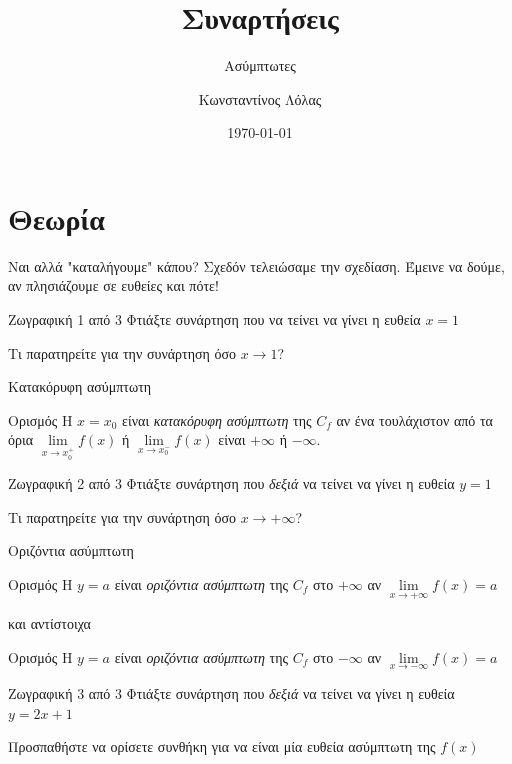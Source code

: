 \documentclass{presentation}
\title{Συναρτήσεις}
\subtitle{Ασύμπτωτες}
\author[Λόλας]{Κωνσταντίνος Λόλας}
\date{\today}
\begin{document}
\begin{frame}
  \titlepage
\end{frame}

\section{Θεωρία}
\begin{frame}{Ναι αλλά "καταλήγουμε" κάπου?}
  Σχεδόν τελειώσαμε την σχεδίαση. Έμεινε να δούμε, αν πλησιάζουμε σε ευθείες και πότε!
\end{frame}

\begin{frame}{Ζωγραφική 1 από 3}
  Φτιάξτε συνάρτηση που να τείνει να γίνει η ευθεία $x=1$

   Τι παρατηρείτε για την συνάρτηση όσο $x\to 1$?
\end{frame}

\begin{frame}{Κατακόρυφη ασύμπτωτη}
  \begin{block}{Ορισμός}
    Η $x=x_0$ είναι \emph{κατακόρυφη ασύμπτωτη} της $C_f$ αν ένα τουλάχιστον από τα όρια $\lim\limits_{x \to x_0^+}{ f(x) }$ ή $\lim\limits_{x \to x_0^-}{ f(x) }$ είναι $+\infty$ ή $-\infty$.
  \end{block}
\end{frame}

\begin{frame}{Ζωγραφική 2 από 3}
  Φτιάξτε συνάρτηση που \emph{δεξιά} να τείνει να γίνει η ευθεία $y=1$

   Τι παρατηρείτε για την συνάρτηση όσο $x\to +\infty$?
\end{frame}

\begin{frame}{Οριζόντια ασύμπτωτη}
  \begin{block}{Ορισμός}
    Η $y=a$ είναι \emph{οριζόντια ασύμπτωτη} της $C_f$ στο $+\infty$ αν $\lim\limits_{x \to +\infty}{ f(x) }=a$
  \end{block}
  και αντίστοιχα
  \begin{block}{Ορισμός}
    Η $y=a$ είναι \emph{οριζόντια ασύμπτωτη} της $C_f$ στο $-\infty$ αν $\lim\limits_{x \to -\infty}{ f(x) }=a$
  \end{block}
\end{frame}

\begin{frame}{Ζωγραφική 3 από 3}
  Φτιάξτε συνάρτηση που \emph{δεξιά} να τείνει να γίνει η ευθεία $y=2x+1$

   Προσπαθήστε να ορίσετε συνθήκη για να είναι μία ευθεία ασύμπτωτη της $f(x)$
\end{frame}
\end{document}
